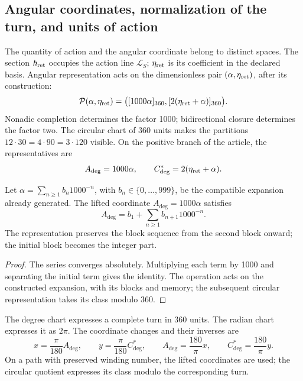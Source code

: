 \subsection{Angular coordinates, normalization of the turn, and units of action}
\label{v:ant:sec:ii-angulos}

The quantity of action and the angular coordinate belong to distinct
spaces. The section \(\hbar_{\rm ret}\) occupies the action line
\(\mathcal L_S\); \(\eta_{\rm ret}\) is its coefficient in the
declared basis. Angular representation acts on the dimensionless pair
\((\alpha,\eta_{\rm ret})\), after its construction:
\begin{equation}
 \mathcal P(\alpha,\eta_{\rm ret})
 =\bigl([1000\alpha]_{360},[2(\eta_{\rm ret}+\alpha)]_{360}\bigr).
 \label{v:ant:eq:ii-par-angular}
\end{equation}
Nonadic completion determines the factor 1000; bidirectional
closure determines the factor two. The circular chart of 360
units makes the partitions
\(12\cdot30=4\cdot90=3\cdot120\) visible. On the positive branch of
the article, the representatives are
\[
 A_{\deg}=1000\alpha,\qquad
 C^*_{\deg}=2(\eta_{\rm ret}+\alpha).
\]

\begin{proposition}
\label{v:ant:prop:ii-desplazamiento-angular}
Let \(\alpha=\sum_{n\geq1}b_n1000^{-n}\), with
\(b_n\in\{0,\ldots,999\}\), be the compatible expansion already generated.
The lifted coordinate \(A_{\deg}=1000\alpha\) satisfies
\[
 A_{\deg}=b_1+\sum_{n\geq1}b_{n+1}1000^{-n}.
\]
The representation preserves the block sequence from the second block onward;
the initial block becomes the integer part.
\end{proposition}
\begin{proof}
The series converges absolutely. Multiplying each term by 1000
and separating the initial term gives the identity. The operation
acts on the constructed expansion, with its blocks and memory;
the subsequent circular representation takes its class modulo 360.
\end{proof}

\begin{definition}
The degree chart expresses a complete turn in 360 units.
The radian chart expresses it as \(2\pi\). The coordinate changes
and their inverses are
\[
 x=\frac{\pi}{180}A_{\deg},\qquad
 y=\frac{\pi}{180}C^*_{\deg},\qquad
 A_{\deg}=\frac{180}{\pi}x,\qquad
 C^*_{\deg}=\frac{180}{\pi}y.
\]
On a path with preserved winding number, the lifted coordinates
are used; the circular quotient expresses its class modulo
the corresponding turn.
\end{definition}

